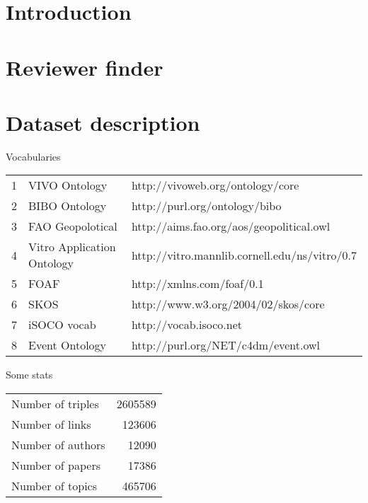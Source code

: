 \documentclass{llncs}
\begin{document}
\section{Introduction}\label{sec:Introduction}


%



\section{Reviewer finder}\label{sec:Motivation}


\section{Dataset description}
Vocabularies

\begin{tabular}{ l l l }
  1 & VIVO Ontology & http://vivoweb.org/ontology/core \\
  2 & BIBO Ontology & http://purl.org/ontology/bibo \\
  3 & FAO Geopolotical  & http://aims.fao.org/aos/geopolitical.owl \\
  4 & Vitro Application Ontology  & http://vitro.mannlib.cornell.edu/ns/vitro/0.7 \\
  5 & FOAF  & http://xmlns.com/foaf/0.1 \\
  6 & SKOS  & http://www.w3.org/2004/02/skos/core \\
  7 & iSOCO vocab & http://vocab.isoco.net \\ 
  8 & Event Ontology & http://purl.org/NET/c4dm/event.owl \\       
\end{tabular}

Some stats

\begin{tabular}{ l r  }
  Number of triples & 2605589 \\
  Number of links &   123606  \\
  Number of authors & 12090   \\
  Number of papers & 17386 \\
  Number of topics & 465706 \\
\end{tabular}
\end{document}
